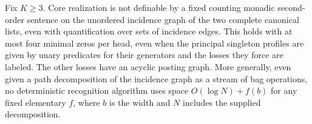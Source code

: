 \begin{theorem}
\label{core:thm:no-cmso-incidence}
Fix $K\ge3$. Core realization is not definable by a fixed counting
monadic second-order sentence on the unordered incidence graph of the
two complete canonical lists, even with quantification over sets of
incidence edges. This holds with at most four minimal zeros per head, even when the
principal singleton profiles are given by unary predicates for their
generators and the losses they force are labeled. The other losses
have an acyclic posting graph.
More generally, even given a path decomposition of the incidence graph
as a stream of bag operations, no deterministic recognition algorithm
uses space $O(\log N)+f(b)$ for any fixed elementary $f$, where $b$
is the width and $N$ includes the supplied decomposition.
\end{theorem}
